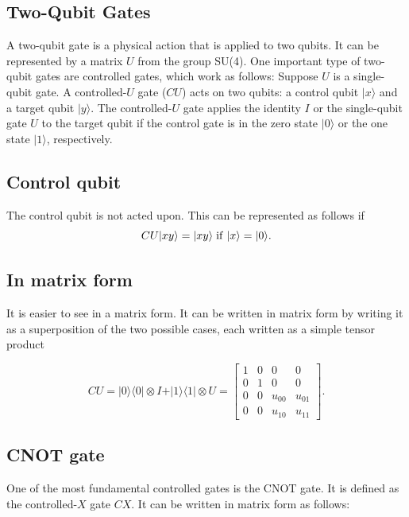 \documentclass[%
oneside,                 %
final,                   %
10pt]{article}
\begin{document}
\subsection{Two-Qubit Gates}

A two-qubit gate is a physical action that is applied to two
qubits. It can be represented by a matrix $U$ from the group
SU(4). One important type of two-qubit gates are controlled gates,
which work as follows: Suppose $U$ is a single-qubit gate. A
controlled-$U$ gate ($CU$) acts on two qubits: a control qubit
$\vert x \rangle $ and a target qubit $\vert y \rangle $. The controlled-$U$ gate
applies the identity $I$ or the single-qubit gate $U$ to the target
qubit if the control gate is in the zero state $\vert 0\rangle$ or the one
state $\vert 1\rangle$, respectively.

\subsection{Control qubit}
The control qubit is not acted
upon. This can be represented as follows if
\[CU\vert xy\rangle=
\vert xy\rangle \hspace{0.1cm} \mathrm{if} \hspace{0.1cm}  \vert x \rangle =\vert 0\rangle.
\]

\subsection{In matrix form}

It is easier to see in a matrix form.
It can be written in matrix form by writing it as a superposition of
the two possible cases, each written as a simple tensor product

\[
CU = \vert 0\rangle\langle 0\vert\otimes I + \vert 1\rangle\langle 1 \vert \otimes U=\begin{bmatrix}
1 & 0 & 0 & 0 \\
0 & 1 & 0 & 0 \\
0 & 0 & u_{00} & u_{01} \\
0 & 0 & u_{10} & u_{11}
\end{bmatrix}.
\]

\subsection{CNOT gate}

One of the most fundamental controlled gates is the CNOT gate. It is
defined as the controlled-$X$ gate $CX$. It can be written in matrix form as follows:
\end{document}
